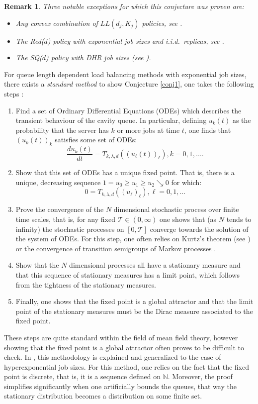 \documentclass[12pt]{report}
\newcommand{\N}{\mathbb{N}}
\newtheorem{remark}{Remark}
\begin{document}
\begin{remark}
	Three notable exceptions for which this conjecture was proven are:
	\begin{itemize}
		\item Any convex combination of $LL(d_j, K_j)$ policies, see \cite{shneer2020large}.
		\item The Red($d$) policy with exponential job sizes and i.i.d.~replicas, see \cite{shneer2020large}.
		\item The SQ($d$) policy with DHR job sizes (see \cite{bramson2012asymptotic}).
	\end{itemize}
\end{remark}
For queue length dependent load balancing methods with exponential job sizes, there exists a \textit{standard method} to show Conjecture \ref{conj1}, one takes the following steps :
\begin{enumerate}[(1)]
	\item Find a set of Ordinary Differential Equations (ODEs) which describes the transient behaviour of the cavity queue. In particular, defining $u_k(t)$ as the probability that the server has $k$ or more jobs at time $t$, one finds that $(u_k(t))_k$ satisfies some set of ODEs:
	$$
	\frac{d u_k(t)}{dt} = T_{k, \lambda, d}((u_\ell(t))_\ell), k =0, 1, \dots.
	$$
	\item Show that this set of ODEs has a unique fixed point. That is, there is a unique, decreasing sequence $1 = u_0  \geq u_1 \geq u_2  \searrow 0$ for which:
	$$
	0 = T_{k, \lambda, d}((u_\ell)_\ell), \ell=0, 1,\dots
	$$
	\item Prove the convergence of the $N$ dimensional stochastic process over finite time scales, that is, for any fixed $\mathcal{T} \in (0,\infty)$ one shows that (as $N$ tends to infinity) the stochastic processes on $[0,\mathcal{T}]$ converge towards the solution of the system of ODEs. For this step, one often relies on Kurtz's theorem (see \cite{ethier1, mitzenmacher2}) or the convergence of transition semigroups of Markov processes \cite{arpanStSyst, vvedenskaya3}.
	\item Show that the $N$ dimensional processes all have a stationary measure and that this sequence of stationary measures has a limit point, which follows from the tightness of the stationary measures.
	\item Finally, one shows that the fixed point is a global attractor and that the limit point of the stationary measures must be the Dirac measure associated to the fixed point.
\end{enumerate}
These steps are quite standard within the field of mean field theory, however showing that the fixed point is a global attractor often proves to be difficult to check. In \cite{van2019global}, this methodology is explained and generalized to the case of hyperexponential job sizes. For this method, one relies on the fact that the fixed point is discrete, that is, it is a sequence defined on $\N$. Moreover, the proof simplifies significantly when one artificially bounds the queues, that way the stationary distribution becomes a distribution on some finite set.
\end{document}
